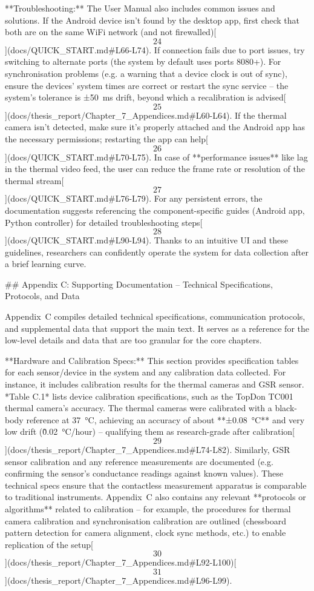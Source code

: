 \documentclass[12pt,a4paper]{article}
\begin{document}
{**Troubleshooting:** The User Manual also includes common issues and
solutions. If the Android device isn't found by the desktop app, first
check that both are on the same WiFi network (and not
firewalled)[\[24\]](docs/QUICK_START.md#L66-L74).
If connection fails due to port issues, try switching to alternate ports
(the system by default uses ports 8080+). For synchronisation problems
(e.g. a warning that a device clock is out of sync), ensure the devices'
system times are correct or restart the sync service -- the system's
tolerance is ±50 ms drift, beyond which a recalibration is
advised[\[25\]](docs/thesis_report/Chapter_7_Appendices.md#L60-L64).
If the thermal camera isn't detected, make sure it's properly attached
and the Android app has the necessary permissions; restarting the app
can
help[\[26\]](docs/QUICK_START.md#L70-L75).
In case of **performance issues** like lag in the thermal video feed,
the user can reduce the frame rate or resolution of the thermal
stream[\[27\]](docs/QUICK_START.md#L76-L79).
For any persistent errors, the documentation suggests referencing the
component-specific guides (Android app, Python controller) for detailed
troubleshooting
steps[\[28\]](docs/QUICK_START.md#L90-L94).
Thanks to an intuitive UI and these guidelines, researchers can
confidently operate the system for data collection after a brief
learning curve.

## Appendix C: Supporting Documentation -- Technical Specifications, Protocols, and Data

Appendix C compiles detailed technical specifications, communication
protocols, and supplemental data that support the main text. It serves
as a reference for the low-level details and data that are too granular
for the core chapters.

**Hardware and Calibration Specs:** This section provides specification
tables for each sensor/device in the system and any calibration data
collected. For instance, it includes calibration results for the thermal
cameras and GSR sensor. *Table C.1* lists device calibration
specifications, such as the TopDon TC001 thermal camera's accuracy. The
thermal cameras were calibrated with a black-body reference at 37 °C,
achieving an accuracy of about **±0.08 °C** and very low drift
(\~0.02 °C/hour) -- qualifying them as research-grade after
calibration[\[29\]](docs/thesis_report/Chapter_7_Appendices.md#L74-L82).
Similarly, GSR sensor calibration and any reference measurements are
documented (e.g. confirming the sensor's conductance readings against
known values). These technical specs ensure that the contactless
measurement apparatus is comparable to traditional instruments.
Appendix C also contains any relevant **protocols or algorithms**
related to calibration -- for example, the procedures for thermal camera
calibration and synchronisation calibration are outlined (chessboard
pattern detection for camera alignment, clock sync methods, etc.) to
enable replication of the
setup[\[30\]](docs/thesis_report/Chapter_7_Appendices.md#L92-L100)[\[31\]](docs/thesis_report/Chapter_7_Appendices.md#L96-L99).

}
\end{document}

